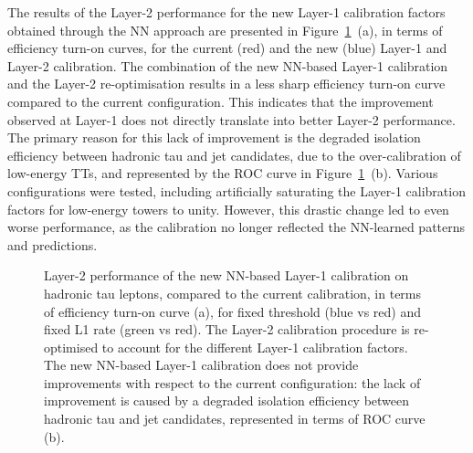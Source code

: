 The results of the Layer-2 performance for the new Layer-1 calibration factors obtained through the NN approach are presented in Figure~\ref{fig:NN_Layer2}~(a), in terms of efficiency turn-on curves, for the current (red) and the new (blue) Layer-1 and Layer-2 calibration. The combination of the new NN-based Layer-1 calibration and the Layer-2 re-optimisation results in a less sharp efficiency turn-on curve compared to the current configuration. 
This indicates that the improvement observed at Layer-1 does not directly translate into better Layer-2 performance. The primary reason for this lack of improvement is the degraded isolation efficiency between hadronic tau and jet candidates, due to the over-calibration of low-energy TTs, and represented by the ROC curve in Figure~\ref{fig:NN_Layer2}~(b).
Various configurations were tested, including artificially saturating the Layer-1 calibration factors for low-energy towers to unity. However, this drastic change led to even worse performance, as the calibration no longer reflected the NN-learned patterns and predictions.

\begin{figure}
    \centering
    \hspace{1cm}
    \caption{Layer-2 performance of the new NN-based Layer-1 calibration on hadronic tau leptons, compared to the current calibration, in terms of efficiency turn-on curve (a), for fixed threshold (blue vs red) and fixed L1 rate (green vs red). The Layer-2 calibration procedure is re-optimised to account for the different Layer-1 calibration factors. The new NN-based Layer-1 calibration does not provide improvements with respect to the current configuration: the lack of improvement is caused by a degraded isolation efficiency between hadronic tau and jet candidates, represented in terms of ROC curve (b).}
    \label{fig:NN_Layer2}
\end{figure}

